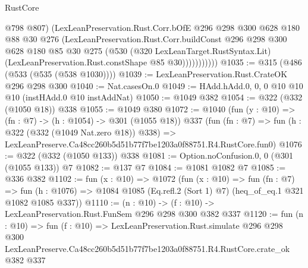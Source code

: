 \begin{lexlean}{RustCore}
\begin{coremodule}
                    @798
                    @807)
                  (LexLeanPreservation.Rust.Corr.bOfE
                    @296
                    @298
                    @300
                    @628
                    @180
                    @88
                    @30
                    @276
                    (LexLeanPreservation.Rust.Corr.buildConst
                      @296
                      @298
                      @300
                      @628
                      @180
                      @85
                      @30
                      @275
                      (@530
                        (@320 LexLeanTarget.RustSyntax.Lit)
                        (LexLeanPreservation.Rust.constShape @85 @30)))))))))))
@1035 := @315 (@486 (@533 (@535 (@538 @1030))))
@1039 := LexLeanPreservation.Rust.CrateOK @296 @298 @300
@1040 := Nat.casesOn.{0}
@1049 := HAdd.hAdd.{0, 0, 0} @10 @10 @10 (instHAdd.{0} @10 instAddNat)
@1050 := @1049 @382
@1054 := @322 (@332 (@1050 @18)) @338
@1055 := @1049 @380
@1072 := @1040
    (fun (y : @10) => (fn : @7) -> (h : @1054) -> @301 (@1055 @18))
    @337
    (fun (fn : @7) =>
    fun (h : @322 (@332 (@1049 Nat.zero @18)) @338) =>
    LexLeanPreserve.Ca48cc260b5d51b77f7be1203a0f88751.R4.RustCore.fun0)
@1076 := @322 (@332 (@1050 @133)) @338
@1081 := Option.noConfusion.{0, 0} (@301 (@1055 @133)) @7
@1082 := @137 @7
@1084 := @1081 @1082 @7
@1085 := @336 @382
@1102 := fun (x : @10) =>
  @1072
    (fun (x : @10) =>
    fun (fn : @7) =>
    fun (h : @1076) => @1084 @1085 (Eq.refl.{2} (Sort 1) @7) (heq_of_eq.{1} @321 @1082 @1085 @337))
@1110 := (n : @10) -> (f : @10) -> LexLeanPreservation.Rust.FunSem @296 @298 @300 @382 @337
@1120 := fun (n : @10) =>
  fun (f : @10) =>
  LexLeanPreservation.Rust.simulate
    @296
    @298
    @300
    LexLeanPreserve.Ca48cc260b5d51b77f7be1203a0f88751.R4.RustCore.crate_ok
    @382
    @337
\end{coremodule}
\end{lexlean}
